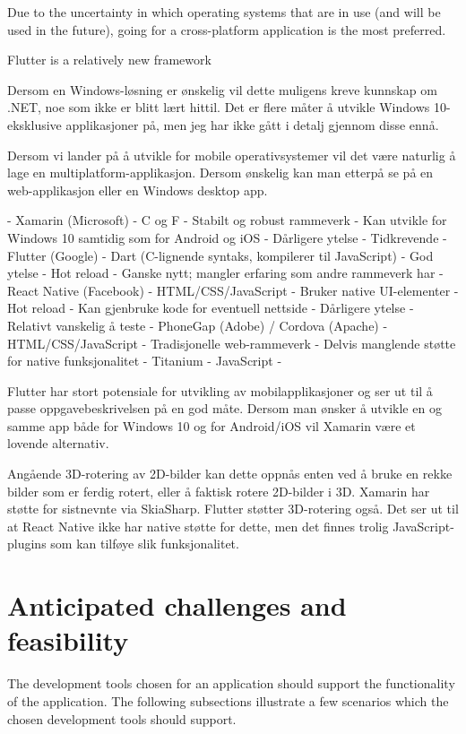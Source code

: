 Due to the uncertainty in which operating systems that are in use (and will be used in the future), going for a cross-platform application is the most preferred. 

Flutter is a relatively new framework

Dersom en Windows-løsning er ønskelig vil dette muligens kreve kunnskap om .NET, noe som ikke er blitt lært hittil. Det er flere måter å utvikle Windows 10-eksklusive applikasjoner på, men jeg har ikke gått i detalj gjennom disse ennå.

Dersom vi lander på å utvikle for mobile operativsystemer vil det være naturlig å lage en multiplatform-applikasjon. Dersom ønskelig kan man etterpå se på en web-applikasjon eller en Windows desktop app.

- Xamarin (Microsoft)
	- C og F
	- Stabilt og robust rammeverk
	- Kan utvikle for Windows 10 samtidig som for Android og iOS
	- Dårligere ytelse
	- Tidkrevende
- Flutter (Google)
	- Dart (C-lignende syntaks, kompilerer til JavaScript)
	- God ytelse
	- Hot reload
	- Ganske nytt; mangler erfaring som andre rammeverk har
- React Native (Facebook)
	- HTML/CSS/JavaScript
	- Bruker native UI-elementer
	- Hot reload
	- Kan gjenbruke kode for eventuell nettside
	- Dårligere ytelse
	- Relativt vanskelig å teste
- PhoneGap (Adobe) / Cordova (Apache)
    - HTML/CSS/JavaScript
    - Tradisjonelle web-rammeverk
    - Delvis manglende støtte for native funksjonalitet
- Titanium
    - JavaScript
    - 

Flutter har stort potensiale for utvikling av mobilapplikasjoner og ser ut til å passe oppgavebeskrivelsen på en god måte. Dersom man ønsker å utvikle en og samme app både for Windows 10 og for Android/iOS vil Xamarin være et lovende alternativ.

Angående 3D-rotering av 2D-bilder kan dette oppnås enten ved å bruke en rekke bilder som er ferdig rotert, eller å faktisk rotere 2D-bilder i 3D. Xamarin har støtte for sistnevnte via SkiaSharp. Flutter støtter 3D-rotering også. Det ser ut til at React Native ikke har native støtte for dette, men det finnes trolig JavaScript-plugins som kan tilføye slik funksjonalitet.

\section{Anticipated challenges and feasibility}

The development tools chosen for an application should support the functionality of the application. The following subsections illustrate a few scenarios which the chosen development tools should support.

